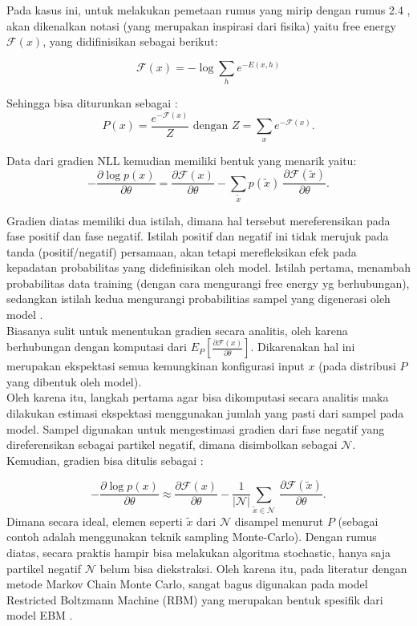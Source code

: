 Pada kasus ini, untuk melakukan pemetaan rumus yang mirip dengan rumus 2.4 , akan dikenalkan notasi (yang merupakan inspirasi dari fisika) yaitu free energy $\mathcal{F}(x)$, yang didifinisikan sebagai berikut:

\begin{equation}
\mathcal{F}(x) = - \log \sum_h e^{-E(x,h)}
\end{equation}

Sehingga bisa diturunkan sebagai :
\[P(x) = \frac{e^{-\mathcal{F}(x)}}{Z} \text{ dengan } Z=\sum_x e^{-\mathcal{F}(x)}.\]

Data dari gradien NLL kemudian memiliki bentuk yang menarik yaitu:
\begin{equation}
- \frac{\partial  \log p(x)}{\partial \theta}
 = \frac{\partial \mathcal{F}(x)}{\partial \theta} -
       \sum_{\tilde{x}} p(\tilde{x}) \
           \frac{\partial \mathcal{F}(\tilde{x})}{\partial \theta}.
\end{equation}

Gradien diatas memiliki dua istilah, dimana hal tersebut mereferensikan pada fase positif dan fase negatif. Istilah positif dan negatif ini tidak merujuk pada tanda (positif/negatif)  persamaan, akan tetapi merefleksikan efek pada kepadatan probabilitas yang didefinisikan oleh model. Istilah pertama, menambah probabilitas data training (dengan cara mengurangi free energy yg berhubungan), sedangkan istilah kedua mengurangi probabilitias sampel yang digenerasi oleh model \citep{tutorial2014lisa}.\\

Biasanya sulit untuk menentukan gradien secara analitis, oleh karena berhubungan dengan komputasi dari $E_P [ \frac{\partial \mathcal{F}(x)} {\partial \theta} ]$. Dikarenakan hal ini merupakan ekspektasi semua kemungkinan konfigurasi input $x$ (pada distribusi $P$ yang dibentuk oleh model).\\
Oleh karena itu, langkah pertama agar bisa dikomputasi secara analitis maka dilakukan estimasi ekspektasi menggunakan jumlah yang pasti dari sampel pada model. Sampel digunakan untuk mengestimasi gradien dari fase negatif yang direferensikan sebagai partikel negatif, dimana disimbolkan sebagai $\mathcal{N}$. Kemudian, gradien bisa ditulis sebagai \citep{tutorial2014lisa} : 

\begin{equation}
- \frac{\partial \log p(x)}{\partial \theta}
 \approx
  \frac{\partial \mathcal{F}(x)}{\partial \theta} -
   \frac{1}{|\mathcal{N}|}\sum_{\tilde{x} \in \mathcal{N}} \
   \frac{\partial \mathcal{F}(\tilde{x})}{\partial \theta}.
\end{equation}
Dimana secara ideal, elemen seperti $\tilde{x}$ dari $\mathcal{N}$ disampel menurut $P$ (sebagai contoh adalah menggunakan teknik sampling Monte-Carlo). Dengan rumus diatas, secara praktis hampir bisa melakukan algoritma stochastic, hanya saja partikel negatif $\mathcal{N}$ belum bisa diekstraksi. Oleh karena itu, pada literatur dengan metode Markov Chain Monte Carlo, sangat bagus digunakan pada model Restricted Boltzmann Machine (RBM) yang merupakan bentuk spesifik dari model EBM \citep{tutorial2014lisa}.


